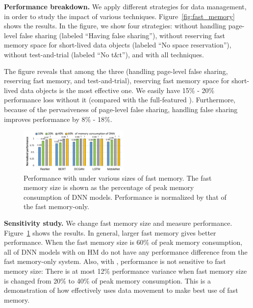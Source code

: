 \textbf{Performance breakdown.}
We apply different strategies for data management, in order to study the impact of various techniques. Figure~\ref{fig:fast_memory} shows the results. In the figure, we show four strategies: \name without handling page-level false sharing (labeled ``Having false sharing''), \name without reserving fast memory space for short-lived data objects (labeled ``No space reservation''), \name without test-and-trial (labeled ``No t\&t''), and \name with all techniques.

The figure reveals that among the three (handling page-level false sharing, reserving fast memory, and test-and-trial), 
reserving fast memory space for short-lived data objects is the most effective one. We easily have \textcolor{check}{15\% - 20\%} 
performance loss without it (compared with the full-featured \name). Furthermore, because of the pervasiveness of page-level false sharing, handling false sharing improves performance by \textcolor{check}{8\% - 18\%}.

\begin{figure}[tb!]
	\centering
	\includegraphics[width=0.48\textwidth]{figures/diff_size.pdf}
	\vspace{-20pt}
\caption{
 Performance with \name under various sizes of fast memory. The fast memory size is shown as the percentage of peak memory consumption of DNN models. Performance is normalized by that of the fast memory-only.
}
\vspace{-10pt}
\label{fig:fast_memory_sen}
\end{figure}


\textbf{Sensitivity study.}
We change fast memory size and measure performance. Figure~\ref{fig:fast_memory_sen} shows the results. In general, larger fast memory gives better performance. When the fast memory size is 60\% of peak memory consumption, all of DNN models with \name on HM do not have any performance difference from the fast memory-only system. Also, with \name, performance is not sensitive to fast memory size: There is at most 12\% performance variance \textcolor{check}{when fast memory size is changed from 20\% to 40\% of peak memory consumption}. This is a demonstration of how \name effectively uses data movement to make best use of fast memory. 


